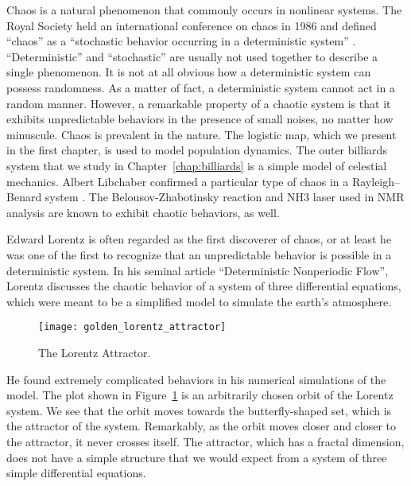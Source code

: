 \documentclass[10pt,twoside,draft]{book}
\begin{document}
Chaos is a natural phenomenon that commonly occurs in nonlinear systems.
The Royal Society held an international conference on chaos in 1986 and defined ``chaos'' as a ``stochastic behavior occurring in a deterministic system'' \citep{stewart}.
``Deterministic'' and ``stochastic'' are usually not used together to describe a single phenomenon.
It is not at all obvious how a deterministic system can possess randomness.
As a matter of fact, a deterministic system cannot act in a random manner.
However, a remarkable property of a chaotic system is that it exhibits unpredictable behaviors in the presence of small noises, no matter how minuscule.
Chaos is prevalent in the nature.
The logistic map, which we present in the first chapter, is used to model population dynamics.
The outer billiards system that we study in Chapter~\ref{chap:billiards} is a simple model of celestial mechanics.
Albert Libchaber confirmed a particular type of chaos in a Rayleigh–Benard system \citep{libchaber}.
The Belousov-Zhabotinsky reaction \citep{zhang} and NH3 laser used in NMR analysis \citep{kantz-schreiber} are known to exhibit chaotic behaviors, as well.


Edward Lorentz is often regarded as the first discoverer of chaos, or at least he was one of the first to recognize that an unpredictable behavior is possible in a deterministic system.
In his seminal article ``Deterministic Nonperiodic Flow'', Lorentz discusses the chaotic behavior of a system of three differential equations, which were meant to be a simplified model to simulate the earth's atmosphere.
\begin{figure}[ht]
  \centering
  \texttt{[image: golden\_lorentz\_attractor]}
  \caption{The Lorentz Attractor.}
  \label{fig:lorentz}
\end{figure}
He found extremely complicated behaviors in his numerical simulations of the model.
The plot shown in Figure~\ref{fig:lorentz} is an arbitrarily chosen orbit of the Lorentz system.
We see that the orbit moves towards the butterfly-shaped set, which is the attractor of the system.
Remarkably, as the orbit moves closer and closer to the attractor, it never crosses itself.
The attractor, which has a fractal dimension, does not have a simple structure that we would expect from a system of three simple differential equations.
\end{document}
